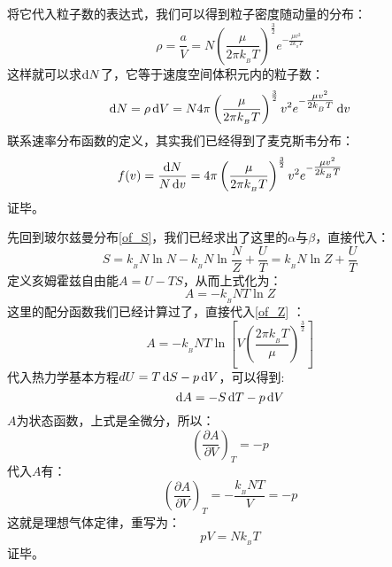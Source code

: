 \begin{prove}
\begin{equation}
    \end{equation}
    将它代入粒子数的表达式，我们可以得到粒子密度随动量的分布：
    \begin{equation}
        \rho = \frac{a}{V} = N\left(\frac{\mu}{2\pi k_{_B}T}\right)^{\frac{3}{2}}e^{-\tfrac{\mu v^{2}}{2k_{_B}T}}
    \end{equation}
    这样就可以求$\dif{N}$了，它等于速度空间体积元内的粒子数：
    \begin{equation}
        \dif{N} = \rho \dif{V} = N4\pi \left(\frac{\mu}{2\pi k_{_B}T}\right)^{\frac{3}{2}}v^{2}e^{-\tfrac{\mu v^{2}}{2k_{_B}T}}\dif{v}
    \end{equation}
    联系速率分布函数的定义，其实我们已经得到了麦克斯韦分布：
    \begin{equation}
        f(v) = \frac{\dif{N}}{N\dif{v}} = 4\pi \left(\frac{\mu}{2\pi k_{_B}T}\right)^{\frac{3}{2}}v^{2}e^{-\tfrac{\mu v^{2}}{2k_{_B}T}}
    \end{equation}
    证毕。
\end{prove}
\begin{prove}
    先回到玻尔兹曼分布\ref{of_S}，我们已经求出了这里的$\alpha$与$\beta$，直接代入：
    \begin{equation}
        S = k_{_B}N\ln N - k_{_B}N\ln\frac{N}{Z} + \frac{U}{T} = k_{_B}N\ln Z + \frac{U}{T}
    \end{equation}
    定义亥姆霍兹自由能$A=U-TS$，从而上式化为：
    \begin{equation}
        A = -k_{_B}NT\ln Z
    \end{equation}
    这里的配分函数我们已经计算过了，直接代入\ref{of_Z}
    ：
    \begin{equation}
        A = -k_{_B}NT\ln\left[V\left(\frac{2\pi k_{_B}T}{\mu}\right)^{\frac{3}{2}}\right]
        \label{of_A}
    \end{equation}
    代入热力学基本方程$dU=T\dif{S}-p\dif{V}$，可以得到:
    \begin{equation}
        \dif{A} = -S\dif{T} - p\dif{V}
        \label{of_dif_A}
    \end{equation}
    $A$为状态函数，上式是全微分，所以：
    \begin{equation}
        \left(\frac{\partial A}{\partial V}\right)_{T} = -p
    \end{equation}
    代入$A$有：
    \begin{equation}
        \left(\frac{\partial A}{\partial V}\right)_{T} = -\frac{k_{_B}NT}{V} =-p
    \end{equation}
    这就是理想气体定律，重写为：
    \begin{equation}
        pV = Nk_{_B}T
    \end{equation}
    证毕。
\end{prove}
